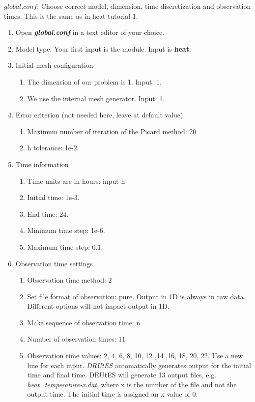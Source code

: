 $global.conf$: Choose correct model, dimension, time discretization and observation times. This is the same as in heat tutorial 1.
\begin{enumerate}
\item Open \textbf{\emph{global.conf}} in a text editor of your choice. 
\item Model type: Your first input is the module. Input is \textbf{heat}.
\item Initial mesh configuration \begin{enumerate}
\item The dimension of our problem is 1. Input: 1.
\item We use the internal mesh generator. Input: 1. 
\end{enumerate}
\item Error criterion (not needed here, leave at default value) \begin{enumerate} 
\item Maximum number of iteration of the Picard method: 20 
\item h tolerance: 1e-2.
\end{enumerate}
\item Time information 
\begin{enumerate} 
\item Time units are in hours: input h
\item Initial time: 1e-3.
\item End time: 24.
\item Minimum time step: 1e-6.
\item Maximum time step: 0.1.
\end{enumerate}
\item Observation time settings \begin{enumerate}
\item Observation time method: 2
\item Set file format of observation: pure. Output in 1D is always in raw data. Different options will not impact output in 1D.
\item Make sequence of observation time: n
\item Number of observation times: 11
\item Observation time values: 2, 4, 6, 8, 10, 12 ,14 ,16, 18, 20, 22. Use a new line for each input. \textit{DRUtES} automatically generates output for the initial time and final time. DRUtES will generate 13 output files, e.g. \textit{heat\_temperature-x.dat}, where x is the number of the file and not the output time. The initial time is assigned an x value of 0. 

\end{enumerate}
\end{enumerate}
